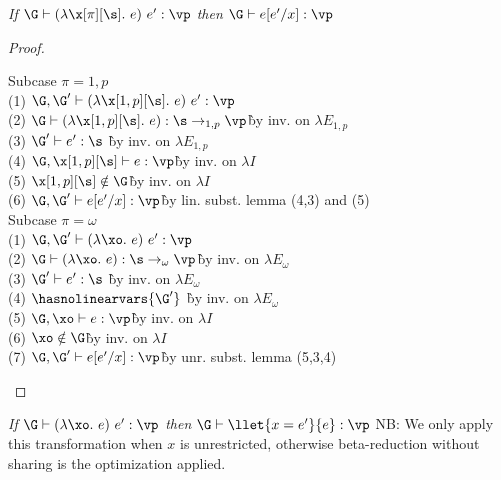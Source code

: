 \begin{lemma}
    \emph{If $\G \vdash (\lambda \x[\pi][\s].~e)~e' : \vp$ then $\G \vdash e[e'/x] : \vp$}
\end{lemma}

\begin{proof}
\begin{description}

\begin{tabbing}
    Subcase $\pi = 1,p$\\
    (1) $\G,\G' \vdash (\lambda \x[1,p][\s].~e)~e' : \vp$\\
    (2) $\G \vdash (\lambda \x[1,p][\s].~e) : \s \to_{1,p} \vp$\` by inv. on $\lambda E_{1,p}$\\
    (3) $\G' \vdash e' : \s$ \` by inv. on $\lambda E_{1,p}$\\
    (4) $\G,\x[1,p][\s] \vdash e : \vp $\`by inv. on $\lambda I$\\
    (5) $\x[1,p][\s] \notin \G$\`by inv. on $\lambda I$\\
    (6) $\G,\G' \vdash e[e'/x] : \vp$\` by lin. subst. lemma (4,3) and (5)\\
    Subcase $\pi = \omega$\\
    (1) $\G,\G' \vdash (\lambda \xo.~e)~e' : \vp$\\
    (2) $\G \vdash (\lambda \xo.~e) : \s \to_\omega \vp$\` by inv. on $\lambda E_\omega$\\
    (3) $\G' \vdash e' : \s$ \` by inv. on $\lambda E_\omega$\\
    (4) $\hasnolinearvars{\G'}$ \` by inv. on $\lambda E_\omega$\\
    (5) $\G,\xo \vdash e : \vp$\` by inv. on $\lambda I$\\
    (6) $\xo \notin \G$\` by inv. on $\lambda I$\\
    (7) $\G,\G' \vdash e[e'/x] : \vp$\` by unr. subst. lemma (5,3,4)\\
\end{tabbing}
\end{description}
\end{proof}

\begin{lemma}
    \emph{If $\G \vdash (\lambda \xo.~e)~e' : \vp$ then $\G \vdash \llet{x = e'}{e} : \vp$}
    NB: We only apply this transformation when $x$ is unrestricted, otherwise beta-reduction without sharing is the optimization applied.
\end{lemma}


